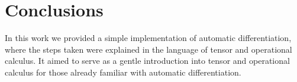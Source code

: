 \section{Conclusions}

In this work we provided a simple implementation of automatic differentiation, where the steps taken were explained in the language of tensor and operational calculus. It aimed to serve as a gentle introduction into tensor and operational calculus for those already familiar with automatic differentiation.
